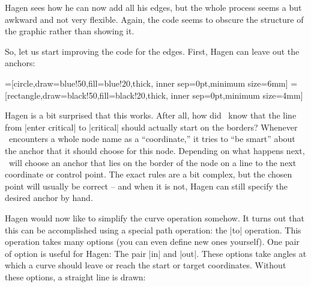 Hagen sees how he can now add all his edges, but the whole process
seems a but awkward and not very flexible. Again, the code seems to
obscure the structure of the graphic rather than showing it.

So, let us start improving the code for the edges. First, Hagen can
leave out the anchors:

{
=[circle,draw=blue!50,fill=blue!20,thick,
                   inner sep=0pt,minimum size=6mm]
=[rectangle,draw=black!50,fill=black!20,thick,
                        inner sep=0pt,minimum size=4mm]
\begin{codeexample}[]
\end{codeexample}
}

Hagen is a bit surprised that this works. After all, how did
\tikzname\ know that the line from |enter critical| to |critical|
should actually start on the borders? Whenever \tikzname\ encounters a
whole node name as a ``coordinate,'' it tries to ``be smart'' about
the anchor that it should choose for this node. Depending on what
happens next, \tikzname\ will choose an anchor that lies on the border
of the node on a line to the next coordinate or control point. The
exact rules are a bit complex, but the chosen point will usually be
correct -- and when it is not, Hagen can still specify the desired
anchor by hand.

Hagen would now like to simplify the curve operation somehow. It turns
out that this can be accomplished using a special path operation: the
|to| operation. This operation takes many options (you can even define
new ones yourself). One pair of option is useful for Hagen: The pair
|in| and |out|. These options take angles at which a curve should
leave or reach the start or target coordinates. Without these options,
a straight line is drawn:

